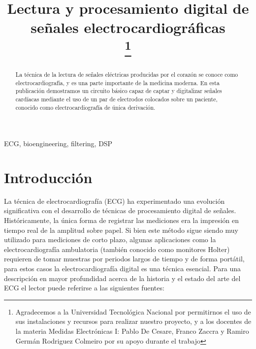 \documentclass[conference]{IEEEtran}
\begin{document}
 
 
\title{Lectura y procesamiento digital de señales electrocardiográficas\\
\thanks{Agradecemos a la Universidad Tecnológica Nacional por permitirnos
el uso de sus instalaciones y recursos para realizar nuestro proyecto, y a los
docentes de la materia Medidas Electrónicas I: Pablo De Cesare, Franco Zaccra
y Ramiro Germán Rodriguez Colmeiro por su apoyo durante el trabajo}
}

\author{
\and
{}
}

\maketitle

\begin{abstract}
La técnica de la lectura de señales eléctricas producidas por el corazón se conoce
como electrocardiografía, y es una parte importante de la medicina moderna. En esta
publicación demostramos un circuito básico capaz de captar y digitalizar señales
cardíacas mediante el uso de un par de electrodos colocados sobre un paciente,
conocido como electrocardiografía de única derivación. 
\end{abstract}

\begin{IEEEkeywords}
ECG, bioengineering, filtering, DSP
\end{IEEEkeywords}

\section{Introducción}
 
La técnica de electrocardiografía (ECG) ha experimentado una evolución significativa
con el desarrollo de técnicas de procesamiento digital de señales. Históricamente,
la única forma de registrar las mediciones era la impresión en tiempo real de la amplitud
sobre papel. Si bien este método sigue siendo muy utilizado para mediciones de corto
plazo, algunas aplicaciones como la electrocardiografía ambulatoria (también conocido como
monitores Holter) requieren de tomar muestras por periodos largos de tiempo y de forma portátil, para estos casos la electrocardiografía digital es una técnica esencial. Para una descripción en mayor profundidad acerca de la historia y el estado del arte del ECG  el lector puede referirse a las siguientes fuentes: \cite{ecg_history} \cite{ecg_moderno}
  
\end{document}
